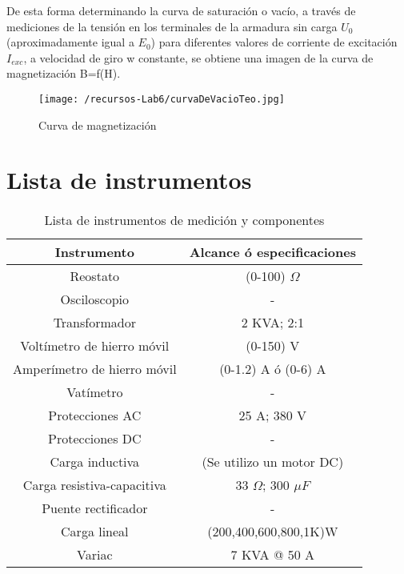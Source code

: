 \documentclass[11pt,letterpaper]{article}     %
\begin{document}
De esta forma determinando la curva de saturación o vacío, a través de
mediciones de la tensión en los terminales de la armadura sin carga $U_{0}$
(aproximadamente igual a $E_{0}$) para diferentes valores de corriente de excitación $I_{exc}$, a velocidad de giro w constante, se obtiene una imagen de la curva de magnetización B=f(H).
\begin{figure}[H]
    \centering
    \texttt{[image: /recursos-Lab6/curvaDeVacioTeo.jpg]}
    \caption{Curva de magnetización}
    \label{fig:curvaDeVacioTeo}
\end{figure}
\section{Lista de instrumentos}
\begin{table}[H]
	\caption{Lista de instrumentos de medición y componentes}
	\centering
	\begin{tabular}{|c|c|}
		\hline 
		Instrumento & Alcance ó especificaciones \\ \hline 
		Reostato &  (0-100) $\Omega$ \\  
		\hline 
		Osciloscopio &  - \\ 
		\hline 
		Transformador &  2 KVA; 2:1 \\  
		\hline 
		Voltímetro de hierro móvil &  (0-150) V\\  
		\hline 
		Amperímetro de hierro móvil &(0-1.2) A ó (0-6) A \\ 
		\hline
		Vatímetro & -	\\
		\hline
		Protecciones AC & 25 A; 380 V\\ 
		\hline
		Protecciones DC & -\\ 
		\hline
		Carga inductiva& (Se utilizo un motor DC) \\ 
		\hline
		Carga resistiva-capacitiva& 33 $\Omega$; 300 $\mu F$ \\ 
		\hline
		Puente rectificador & -  \\
		\hline
		Carga lineal & (200,400,600,800,1K)W  \\
		\hline
		Variac & 7 KVA @ 50 A 
		\\
		\hline 
	\end{tabular} 
\end{table}
\end{document}
